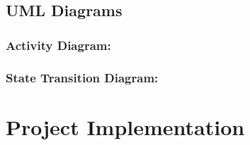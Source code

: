 \documentclass[oneside,a4paper,12pt]{report}
\begin{document}
\pagebreak
\section{UML Diagrams}

\subsection{Activity Diagram:}


\clearpage
\subsection{State Transition Diagram:}




\chapter{Project Implementation}
\end{document}
